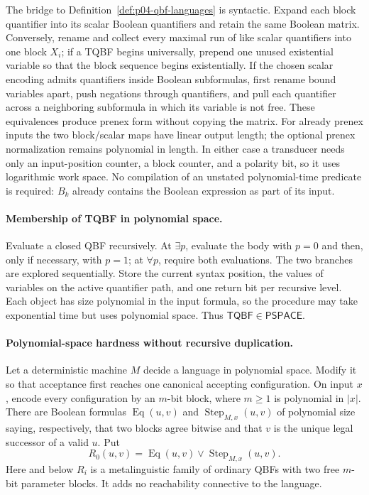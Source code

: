 The bridge to Definition~\ref{def:p04-qbf-languages} is syntactic.  Expand each
block quantifier into its scalar Boolean quantifiers and retain the same Boolean
matrix.  Conversely, rename and collect every maximal run of like scalar
quantifiers into one block \(X_i\); if a TQBF begins universally, prepend one
unused existential variable so that the block sequence begins existentially.
If the chosen scalar encoding admits quantifiers inside Boolean subformulas,
first rename bound variables apart, push negations through quantifiers, and pull
each quantifier across a neighboring subformula in which its variable is not
free.  These equivalences produce prenex form without copying the matrix.
For already prenex inputs the two block/scalar maps have linear output length;
the optional prenex normalization remains polynomial in length.  In either
case a transducer needs only an input-position counter, a block counter, and a
polarity bit, so it uses logarithmic work space.  No compilation of an unstated
polynomial-time predicate is required: \(B_k\) already contains the Boolean
expression as part of its input.

\paragraph{Membership of TQBF in polynomial space.}
Evaluate a closed QBF recursively.  At \(\exists p\), evaluate the body with
\(p=0\) and then, only if necessary, with \(p=1\); at \(\forall p\), require
both evaluations.  The two branches are explored sequentially.  Store the
current syntax position, the values of variables on the active quantifier path,
and one return bit per recursive level.  Each object has size polynomial in the
input formula, so the procedure may take exponential time but uses polynomial
space.  Thus \(\mathsf{TQBF}\in\mathsf{PSPACE}\).

\paragraph{Polynomial-space hardness without recursive duplication.}
Let a deterministic machine \(M\) decide a language in polynomial space.
Modify it so that acceptance first reaches one canonical accepting
configuration.  On input \(x\), encode every configuration by an \(m\)-bit
block, where \(m\geq1\) is polynomial in \(|x|\).  There are Boolean formulas
\(\operatorname{Eq}(u,v)\) and
\(\operatorname{Step}_{M,x}(u,v)\) of polynomial size saying, respectively,
that two blocks agree bitwise and that \(v\) is the unique legal successor of a
valid \(u\).  Put
\[
 R_0(u,v)=\operatorname{Eq}(u,v)\lor
          \operatorname{Step}_{M,x}(u,v).
\]
Here and below \(R_i\) is a metalinguistic family of ordinary QBFs with two free
\(m\)-bit parameter blocks.  It adds no reachability connective to the
language.

